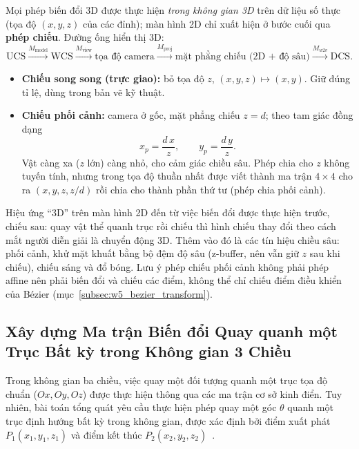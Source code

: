 Mọi phép biến đổi 3D được thực hiện \emph{trong không gian 3D} trên dữ liệu số thực (tọa độ $(x, y, z)$ của các đỉnh); màn hình 2D chỉ xuất hiện ở bước cuối qua \textbf{phép chiếu}. Đường ống hiển thị 3D:
\begin{equation}
\text{UCS} \xrightarrow{M_{\text{model}}} \text{WCS} \xrightarrow{M_{\text{view}}} \text{tọa độ camera} \xrightarrow{M_{\text{proj}}} \text{mặt phẳng chiếu (2D + độ sâu)} \xrightarrow{M_{w2v}} \text{DCS}.
\end{equation}
\begin{itemize}
    \item \textbf{Chiếu song song (trực giao):} bỏ tọa độ $z$, $(x, y, z) \mapsto (x, y)$. Giữ đúng tỉ lệ, dùng trong bản vẽ kỹ thuật.
    \item \textbf{Chiếu phối cảnh:} camera ở gốc, mặt phẳng chiếu $z = d$; theo tam giác đồng dạng
    \begin{equation}
    x_p = \frac{d\,x}{z}, \qquad y_p = \frac{d\,y}{z}.
    \end{equation}
    Vật càng xa ($z$ lớn) càng nhỏ, cho cảm giác chiều sâu. Phép chia cho $z$ không tuyến tính, nhưng trong tọa độ thuần nhất được viết thành ma trận $4 \times 4$ cho ra $(x, y, z, z/d)$ rồi chia cho thành phần thứ tư (phép chia phối cảnh).
\end{itemize}
Hiệu ứng ``3D'' trên màn hình 2D đến từ việc biến đổi được thực hiện trước, chiếu sau: quay vật thể quanh trục rồi chiếu thì hình chiếu thay đổi theo cách mắt người diễn giải là chuyển động 3D. Thêm vào đó là các tín hiệu chiều sâu: phối cảnh, khử mặt khuất bằng bộ đệm độ sâu (z-buffer, nên vẫn giữ $z$ sau khi chiếu), chiếu sáng và đổ bóng. Lưu ý phép chiếu phối cảnh không phải phép affine nên phải biến đổi và chiếu các điểm, không thể chỉ chiếu điểm điều khiển của Bézier (mục~\ref{subsec:w5_bezier_transform}).

\subsection{Xây dựng Ma trận Biến đổi Quay quanh một Trục Bất kỳ trong Không gian 3 Chiều}
\label{subsec:rotate_arbitrary_axis_3d}

Trong không gian ba chiều, việc quay một đối tượng quanh một trục tọa độ chuẩn ($Ox, Oy, Oz$) được thực hiện thông qua các ma trận cơ sở kinh điển. Tuy nhiên, bài toán tổng quát yêu cầu thực hiện phép quay một góc $\theta$ quanh một trục định hướng bất kỳ trong không gian, được xác định bởi điểm xuất phát $P_1(x_1, y_1, z_1)$ và điểm kết thúc $P_2(x_2, y_2, z_2)$~\citep{hearn2004computer}.

